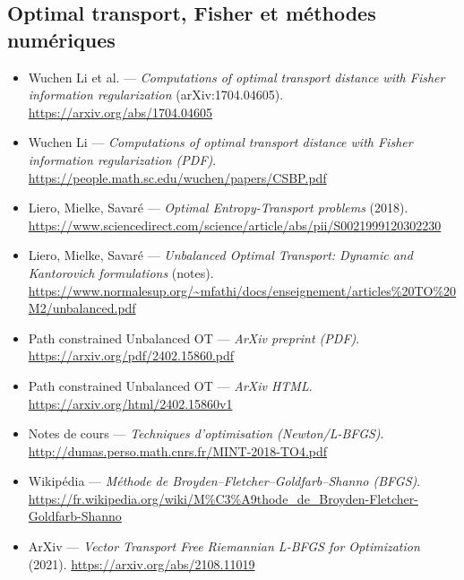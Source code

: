 \documentclass[a4paper,12pt]{article}
\begin{document}
\subsection*{Optimal transport, Fisher et méthodes numériques}
\begin{itemize}
\item Wuchen Li et al. — \textit{Computations of optimal transport distance with Fisher information regularization} (arXiv:1704.04605). \url{https://arxiv.org/abs/1704.04605}
\item Wuchen Li — \textit{Computations of optimal transport distance with Fisher information regularization (PDF)}. \url{https://people.math.sc.edu/wuchen/papers/CSBP.pdf}
\item Liero, Mielke, Savaré — \textit{Optimal Entropy-Transport problems} (2018). \url{https://www.sciencedirect.com/science/article/abs/pii/S0021999120302230}
\item Liero, Mielke, Savaré — \textit{Unbalanced Optimal Transport: Dynamic and Kantorovich formulations} (notes). \url{https://www.normalesup.org/~mfathi/docs/enseignement/articles%20TO%20M2/unbalanced.pdf}
\item Path constrained Unbalanced OT — \textit{ArXiv preprint (PDF)}. \url{https://arxiv.org/pdf/2402.15860.pdf}
\item Path constrained Unbalanced OT — \textit{ArXiv HTML}. \url{https://arxiv.org/html/2402.15860v1}
\item Notes de cours — \textit{Techniques d’optimisation (Newton/L-BFGS)}. \url{http://dumas.perso.math.cnrs.fr/MINT-2018-TO4.pdf}
\item Wikipédia — \textit{Méthode de Broyden–Fletcher–Goldfarb–Shanno (BFGS)}. \url{https://fr.wikipedia.org/wiki/M%C3%A9thode_de_Broyden-Fletcher-Goldfarb-Shanno}
\item ArXiv — \textit{Vector Transport Free Riemannian L-BFGS for Optimization} (2021). \url{https://arxiv.org/abs/2108.11019}
\end{itemize}
\end{document}
